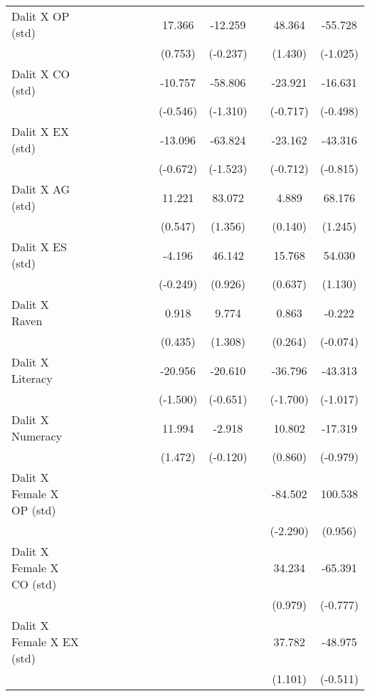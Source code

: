 {\begin{longtable}{@{\extracolsep{\fill}}lccccccccccc}
    Dalit X OP (std) &   &   &   &   &   &   & 17.366 & -12.259 &   & 48.364 & -55.728 \\
      &   &   &   &   &   &   & (0.753) & (-0.237) &   & (1.430) & (-1.025) \\
    Dalit X CO (std) &   &   &   &   &   &   & -10.757 & -58.806 &   & -23.921 & -16.631 \\
      &   &   &   &   &   &   & (-0.546) & (-1.310) &   & (-0.717) & (-0.498) \\
    Dalit X EX (std) &   &   &   &   &   &   & -13.096 & -63.824 &   & -23.162 & -43.316 \\
      &   &   &   &   &   &   & (-0.672) & (-1.523) &   & (-0.712) & (-0.815) \\
    Dalit X AG (std) &   &   &   &   &   &   & 11.221 & 83.072 &   & 4.889 & 68.176 \\
      &   &   &   &   &   &   & (0.547) & (1.356) &   & (0.140) & (1.245) \\
    Dalit X ES (std) &   &   &   &   &   &   & -4.196 & 46.142 &   & 15.768 & 54.030 \\
      &   &   &   &   &   &   & (-0.249) & (0.926) &   & (0.637) & (1.130) \\
    Dalit X Raven &   &   &   &   &   &   & 0.918 & 9.774 &   & 0.863 & -0.222 \\
      &   &   &   &   &   &   & (0.435) & (1.308) &   & (0.264) & (-0.074) \\
    Dalit X Literacy &   &   &   &   &   &   & -20.956 & -20.610 &   & -36.796 & -43.313 \\
      &   &   &   &   &   &   & (-1.500) & (-0.651) &   & (-1.700) & (-1.017) \\
    Dalit X Numeracy &   &   &   &   &   &   & 11.994 & -2.918 &   & 10.802 & -17.319 \\
      &   &   &   &   &   &   & (1.472) & (-0.120) &   & (0.860) & (-0.979) \\
    Dalit X Female X OP (std) &   &   &   &   &   &   &   &   &   & -84.502 & 100.538 \\
      &   &   &   &   &   &   &   &   &   & (-2.290) & (0.956) \\
    Dalit X Female X CO (std) &   &   &   &   &   &   &   &   &   & 34.234 & -65.391 \\
      &   &   &   &   &   &   &   &   &   & (0.979) & (-0.777) \\
    Dalit X Female X EX (std) &   &   &   &   &   &   &   &   &   & 37.782 & -48.975 \\
      &   &   &   &   &   &   &   &   &   & (1.101) & (-0.511) \\

\end{longtable}}

